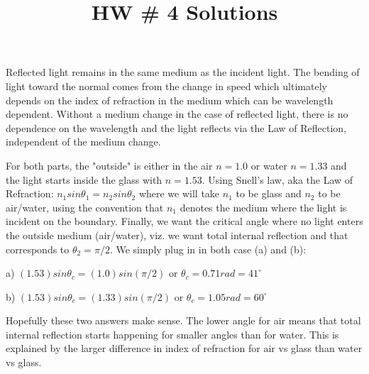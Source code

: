 \documentclass[10pt]{article}
\newenvironment{problem}[2][Problem]{\begin{trivlist}
\item[\hskip \labelsep {\bfseries #1}\hskip \labelsep {\bfseries #2.}]}{\end{trivlist}}
\begin{document}
 \title{HW \# 4 Solutions}
\date{}
\maketitle

\begin{problem}{1}
Reflected light remains in the same medium as the incident light. The bending of light toward the normal comes from the change in speed which ultimately depends on the index of refraction in the medium which can be wavelength dependent. Without a medium change in the case of reflected light, there is no dependence on the wavelength and the light reflects via the Law of Reflection, independent of the medium change.

\end{problem}


 \begin{problem}{2}
\item For both parts, the "outside" is either in the air $n=1.0$ or water $n=1.33$ and the light starts inside the glass with $n=1.53$. Using Snell's law, aka the Law of Refraction: $n_1 sin\theta_1 = n_2 sin\theta_2$ where we will take $n_1$ to be glass and $n_2$ to be air/water, using the convention that $n_1$ denotes the medium where the light is incident on the boundary. Finally, we want the critical angle where no light enters the outside medium (air/water), viz. we want total internal reflection and that corresponds to $\theta_2=\pi/2$. We simply plug in in both case (a) and (b):

\item a) $(1.53) sin\theta_c= (1.0) sin(\pi/2)$ or $\theta_c=0.71rad=41^\circ$

\item b) $(1.53) sin\theta_c= (1.33) sin(\pi/2)$ or $\theta_c=1.05rad=60^\circ$

\item
Hopefully these two answers make sense. The lower angle for air means that total internal reflection starts happening for smaller angles than for water. This is explained by the larger difference in index of refraction for air vs glass than water vs glass.
\end{problem}
\end{document}
